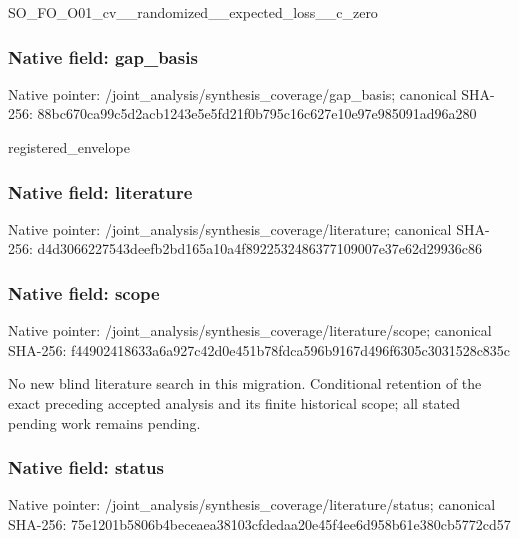 \documentclass[10pt,a4paper]{article}
\begin{document}
\begingroup\raggedright\sloppy SO\_\allowbreak{}FO\_\allowbreak{}O01\_\allowbreak{}cv\_\allowbreak{}\_\allowbreak{}randomized\_\allowbreak{}\_\allowbreak{}expected\_\allowbreak{}loss\_\allowbreak{}\_\allowbreak{}c\_\allowbreak{}zero\par\endgroup

\subsubsection{Native field: gap\_\allowbreak{}basis}
Native pointer: /joint\_\allowbreak{}analysis/synthesis\_\allowbreak{}coverage/gap\_\allowbreak{}basis; canonical SHA-256: 88bc670ca99c5d2acb1243e5e5fd21f0b795c16c627e10e97e985091ad96a280

\begingroup\raggedright\sloppy registered\_\allowbreak{}envelope\par\endgroup

\subsubsection{Native field: literature}
Native pointer: /joint\_\allowbreak{}analysis/synthesis\_\allowbreak{}coverage/literature; canonical SHA-256: d4d3066227543deefb2bd165a10a4f8922532486377109007e37e62d29936c86

\subsubsection{Native field: scope}
Native pointer: /joint\_\allowbreak{}analysis/synthesis\_\allowbreak{}coverage/literature/scope; canonical SHA-256: f44902418633a6a927c42d0e451b78fdca596b9167d496f6305c3031528c835c

\begingroup\raggedright\sloppy No new blind literature search in this migration. Conditional retention of the exact preceding accepted analysis and its finite historical scope;\allowbreak{} all stated pending work remains pending.\par\endgroup

\subsubsection{Native field: status}
Native pointer: /joint\_\allowbreak{}analysis/synthesis\_\allowbreak{}coverage/literature/status; canonical SHA-256: 75e1201b5806b4beceaea38103cfdedaa20e45f4ee6d958b61e380cb5772cd57
\end{document}
